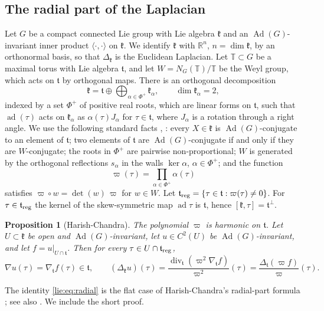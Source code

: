 \documentclass[11pt]{amsart}
\newtheorem{proposition}[theorem]{Proposition}
\theoremstyle{definition}
\theoremstyle{remark}
\numberwithin{equation}{section}
\newcommand{\R}{\mathbb{R}}
\newcommand{\Ad}{\operatorname{Ad}}
\newcommand{\kf}{\mathfrak{k}}
\newcommand{\tf}{\mathfrak{t}}
\begin{document}
\subsection{The radial part of the Laplacian}\label{lie:subsec:radial}

Let $G$ be a compact connected Lie group with Lie algebra $\kf$ and an $\Ad(G)$-invariant inner product $\langle\cdot,\cdot\rangle$ on $\kf$. We identify $\kf$ with $\R^n$, $n=\dim\kf$, by an orthonormal basis, so that $\Delta_\kf$ is the Euclidean Laplacian. Let $\mathbb T\subset G$ be a maximal torus with Lie algebra $\tf$, and let $W=N_G(\mathbb T)/\mathbb T$ be the Weyl group, which acts on $\tf$ by orthogonal maps. There is an orthogonal decomposition
\[
\kf=\tf\oplus\bigoplus_{\alpha\in\Phi^+}\kf_\alpha,\qquad\dim\kf_\alpha=2,
\]
indexed by a set $\Phi^+$ of positive real roots, which are linear forms on $\tf$, such that $\operatorname{ad}(\tau)$ acts on $\kf_\alpha$ as $\alpha(\tau)J_\alpha$ for $\tau\in\tf$, where $J_\alpha$ is a rotation through a right angle. We use the following standard facts \cite[Ch.~IV--V]{BtD85}, \cite[Ch.~1]{Hum90}: every $X\in\kf$ is $\Ad(G)$-conjugate to an element of $\tf$; two elements of $\tf$ are $\Ad(G)$-conjugate if and only if they are $W$-conjugate; the roots in $\Phi^+$ are pairwise non-proportional; $W$ is generated by the orthogonal reflections $s_\alpha$ in the walls $\ker\alpha$, $\alpha\in\Phi^+$; and the function
\[
\varpi(\tau)=\prod_{\alpha\in\Phi^+}\alpha(\tau)
\]
satisfies $\varpi\circ w=\det(w)\,\varpi$ for $w\in W$. Let $\tf_{\rm reg}=\{\tau\in\tf:\varpi(\tau)\neq0\}$. For $\tau\in\tf_{\rm reg}$ the kernel of the skew-symmetric map $\operatorname{ad}\tau$ is $\tf$, hence $[\kf,\tau]=\tf^\perp$.

\begin{proposition}[Harish-Chandra]\label{lie:prop:radial}
The polynomial $\varpi$ is harmonic on $\tf$. Let $U\subset\kf$ be open and $\Ad(G)$-invariant, let $u\in C^2(U)$ be $\Ad(G)$-invariant, and let $f=u|_{U\cap\tf}$. Then for every $\tau\in U\cap\tf_{\rm reg}$,
\begin{equation}\label{lie:eq:radial}
\nabla u(\tau)=\nabla_\tf f(\tau)\in\tf,\qquad(\Delta_\kf u)(\tau)=\frac{\operatorname{div}_\tf(\varpi^2\nabla_\tf f)}{\varpi^2}(\tau)=\frac{\Delta_\tf(\varpi f)}{\varpi}(\tau).
\end{equation}
\end{proposition}

The identity \eqref{lie:eq:radial} is the flat case of Harish-Chandra's radial-part formula \cite{HC57}; see also \cite[Ch.~II]{Hel84}. We include the short proof.
\end{document}
